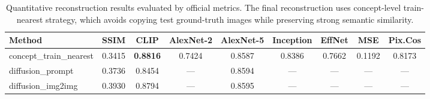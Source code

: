 \begin{table}[htbp]
\centering
\caption{Quantitative reconstruction results evaluated by official metrics. The final reconstruction uses concept-level train-nearest strategy, which avoids copying test ground-truth images while preserving strong semantic similarity.}
\label{tab:reconstruction}
\begin{tabular}{lcccccccc}
\toprule
\textbf{Method} & \textbf{SSIM} & \textbf{CLIP} & \textbf{AlexNet-2} & \textbf{AlexNet-5} & \textbf{Inception} & \textbf{EffNet} & \textbf{MSE} & \textbf{Pix.Cos} \\
\midrule
concept\_train\_nearest & 0.3415 & \textbf{0.8816} & 0.7424 & 0.8587 & 0.8386 & 0.7662 & 0.1192 & 0.8173 \\
diffusion\_prompt & 0.3736 & 0.8454 & --- & 0.8594 & --- & --- & --- & --- \\
diffusion\_img2img & 0.3930 & 0.8794 & --- & 0.8595 & --- & --- & --- & --- \\
\bottomrule
\end{tabular}
\end{table}
